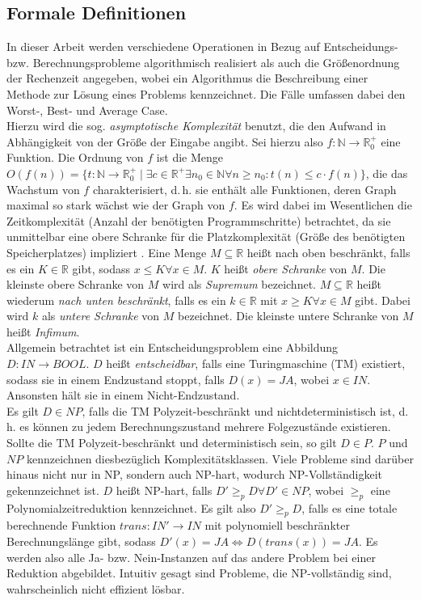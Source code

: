 \subsection{Formale Definitionen}
\label{sec:formal}
In dieser Arbeit werden verschiedene Operationen in Bezug auf Entscheidungs- bzw. Berechnungsprobleme algorithmisch realisiert als auch die Größenordnung der Rechenzeit angegeben, wobei ein Algorithmus die Beschreibung einer Methode zur Lösung eines Problems kennzeichnet. Die Fälle umfassen dabei den Worst-, Best- und Average Case.\\ Hierzu wird die sog. \emph{asymptotische Komplexität} benutzt, die den Aufwand in Abhängigkeit von der Größe der Eingabe angibt. Sei hierzu also $f : \mathbb{N} \rightarrow \mathbb{R}_0^+$ eine Funktion. Die Ordnung von $f$ ist die Menge $O(f(n)) = \{ t : \mathbb{N} \rightarrow \mathbb{R}_0^+ \mid \exists c \in \mathbb{R}^+ \exists n_0 \in \mathbb{N} \forall n \geq n_0 : t(n) \leq c \cdot f(n) \}$, die das Wachstum von $f$ charakterisiert, d.\,h. sie enthält alle Funktionen, deren Graph maximal so stark wächst wie der Graph von $f$. Es wird dabei im Wesentlichen die Zeitkomplexität (Anzahl der benötigten Programmschritte) betrachtet, da sie unmittelbar eine obere Schranke für die Platzkomplexität (Größe des benötigten Speicherplatzes) impliziert \cite[S.118]{mt1998}.
Eine Menge $M \subseteq \mathbb{R}$ heißt nach oben beschränkt, falls es ein $K \in \mathbb{R}$ gibt, sodass $x \leq K \forall x \in M$. $K$ heißt \emph{obere Schranke} von $M$. Die kleinste obere Schranke von $M$ wird als \emph{Supremum} bezeichnet. $M \subseteq \mathbb{R}$ heißt wiederum \emph{nach unten beschränkt}, falls es ein $k \in \mathbb{R}$ mit $x \geq K \forall x \in M$ gibt. Dabei wird $k$ als \emph{untere Schranke} von $M$ bezeichnet. Die kleinste untere Schranke von $M$ heißt \emph{Infimum}.\\
Allgemein betrachtet ist ein Entscheidungsproblem eine Abbildung $D : IN \rightarrow BOOL$. $D$ heißt \emph{entscheidbar}, falls eine Turingmaschine (TM) existiert, sodass sie in einem Endzustand stoppt, falls $D(x)=JA$, wobei $x \in IN$. Ansonsten hält sie in einem Nicht-Endzustand.\\
Es gilt $D \in NP$, falls die TM Polyzeit-beschränkt und nichtdeterministisch ist, d.\,h. es können zu jedem Berechnungszustand mehrere Folgezustände existieren. Sollte die TM Polyzeit-beschränkt und deterministisch sein, so gilt $D \in P$. $P$ und $NP$ kennzeichnen diesbezüglich Komplexitätsklassen. Viele Probleme sind darüber hinaus nicht nur in NP, sondern auch NP-hart, wodurch NP-Vollständigkeit gekennzeichnet ist. $D$ heißt NP-hart, falls $D' \geq_p D \forall D' \in NP$, wobei $\geq_p$ eine Polynomialzeitreduktion kennzeichnet. Es gilt also $D' \geq_p D$, falls es eine totale berechnende Funktion $trans : IN' \rightarrow IN$ mit polynomiell beschränkter Berechnungslänge gibt, sodass $D'(x)=JA \Leftrightarrow D(trans(x))=JA$. Es werden also alle Ja- bzw. Nein-Instanzen auf das andere Problem bei einer Reduktion abgebildet. Intuitiv gesagt sind Probleme, die NP-vollständig sind, wahrscheinlich nicht effizient lösbar.\\
